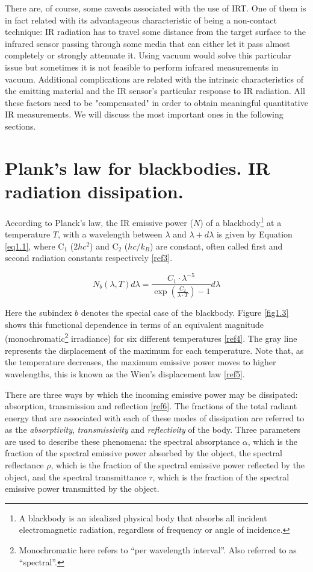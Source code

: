 		There are, of course, some caveats associated with the use of IRT. One of them is in fact related with its advantageous characteristic of being a non-contact technique: IR radiation has to travel some distance from the target surface to the infrared sensor passing through some media that can either let it pass almost completely or strongly attenuate it. Using vacuum would solve this particular issue but sometimes it is not feasible to perform infrared measurements in vacuum. Additional complications are related with the intrinsic characteristics of the emitting material and the IR sensor's particular response to IR radiation. All these factors need to be "compensated" in order to obtain meaningful quantitative IR measurements. We will discuss the most important ones in the following sections.
		
	\section{Plank's law for blackbodies. IR radiation dissipation.}\label{section1.2}
	
		According to Planck’s law, the IR emissive power ($N$) of a blackbody\footnote{{\footnotesize A blackbody is an idealized physical body that absorbs all incident electromagnetic radiation, regardless of frequency or angle of incidence.}} at a temperature $T$, with a wavelength between $\lambda$ and $\lambda+d\lambda$ is given by Equation \ref{eq1.1}, where C$_{1}$ ($2hc^2$) and C$_{2}$ ($hc/k_{B}$) are constant, often called first and second radiation constants respectively \ref{ref3}.
		
		\begin{equation}\label{eq1.1}
			N_{b}(\lambda,T)d\lambda=\frac{C_{1} \cdot \lambda^{-5}}{\exp (\frac{C_{2}}{\lambda\cdot T}) -1} d\lambda
		\end{equation}\bigskip
		
		Here the subindex $b$ denotes the special case of the blackbody. Figure \ref{fig1.3} shows this functional dependence in terms of an equivalent magnitude (monochromatic\footnote{{\footnotesize Monochromatic here refers to “per wavelength interval”. Also referred to as “spectral”.}} irradiance) for six different temperatures \ref{ref4}. The gray line represents the displacement of the maximum for each temperature. Note that, as the temperature decreases, the maximum emissive power moves to higher wavelengths, this is known as the Wien’s displacement law \ref{ref5}.
		
		There are three ways by which the incoming emissive power may be dissipated: absorption, transmission and reflection \ref{ref6}. The fractions of the total radiant energy that are associated with each of these modes of dissipation are referred to as the \textit{absorptivity}, \textit{transmissivity} and \textit{reflectivity} of the body. Three parameters are used to describe these phenomena: the spectral absorptance $\alpha$, which is the fraction of the spectral emissive power absorbed by the object, the spectral reflectance $\rho$, which is the fraction of the spectral emissive power reflected by the object, and the spectral transmittance $\tau$, which is the fraction of the spectral emissive power transmitted by the object.
		
